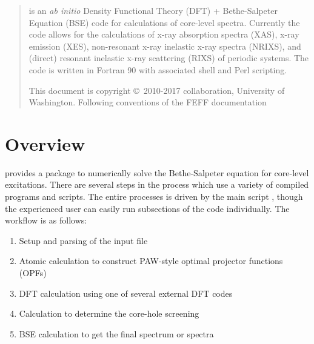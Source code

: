 \documentclass[11pt]{report}
\begin{document}
\MakeTitle

\newchapter{}
\begin{abstract}
 is an {\it ab initio} Density Functional Theory (DFT) + Bethe-Salpeter Equation (BSE) code for calculations of core-level spectra. 
Currently the code allows for the calculations of x-ray absorption spectra (XAS), x-ray emission (XES), non-resonant x-ray inelastic x-ray spectra (NRIXS), and (direct) resonant inelastic x-ray scattering (RIXS) of periodic systems. 
The code is written in Fortran 90 with associated shell and Perl scripting.




 \noindent This document is copyright \copyright\ 2010-2017  collaboration, University of Washington. Following conventions of the FEFF documentation

\end{abstract}

\newchapter{}
\tableofcontents
\newchapter{}

\setcounter{page}{1}


\chapter{Overview}



 provides a package to numerically solve the Bethe-Salpeter equation for core-level excitations. 
There are several steps in the process which use a variety of compiled programs and scripts. 
The entire processes is driven by the main script , though the experienced user 
can easily run subsections of the code individually.
The  workflow is as follows:

\begin{enumerate}
\item Setup and parsing of the input file
\item Atomic calculation to construct PAW-style optimal projector functions (OPFs)
\item DFT calculation using one of several external DFT codes
\item Calculation to determine the core-hole screening
\item BSE calculation to get the final spectrum or spectra
\end{enumerate}
\end{document}
